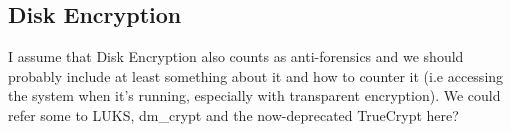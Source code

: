 \subsection{Disk Encryption} %
I assume that Disk Encryption also counts as anti-forensics and we should probably include at least something about it and how to counter it (i.e accessing the system when it's running, especially with transparent encryption). We could refer some to LUKS, dm\_crypt and the now-deprecated TrueCrypt here?